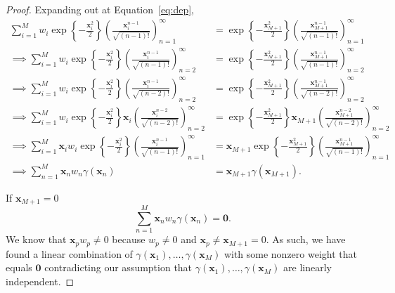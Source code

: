 \begin{proof}
    Expanding out at Equation~\ref{eq:dep},
    \begin{align*}
        \sum_{i = 1}^{M}w_i \exp\left\{-\frac{\mathbf{x}_{i}^2}2 \right\} \left(\frac{ \mathbf{x}_i^{n - 1} }{ \sqrt{(n - 1)!} }\right)_{n=1}^{\infty}
        & =
        \exp\left\{-\frac{\mathbf{x}_{M + 1}^2}2 \right\} \left(\frac{ \mathbf{x}_{M + 1}^{n - 1} }{ \sqrt{(n - 1)!} }\right)_{n=1}^{\infty} \\
        \implies
        \sum_{i = 1}^{M}w_i \exp\left\{-\frac{\mathbf{x}_{i}^2}2 \right\} \left(\frac{ \mathbf{x}_i^{n - 1} }{ \sqrt{(n - 1)!} }\right)_{n=2}^{\infty}
        & =
        \exp\left\{-\frac{\mathbf{x}_{M + 1}^2}2 \right\} \left(\frac{ \mathbf{x}_{M + 1}^{n - 1} }{ \sqrt{(n - 1)!} }\right)_{n=2}^{\infty} \\
        \implies
        \sum_{i = 1}^{M}w_i \exp\left\{-\frac{\mathbf{x}_{i}^2}2 \right\} \left( \frac{ \mathbf{x}_i^{n - 1} }{ \sqrt{(n - 2)!} }\right)_{n=2}^{\infty}
        & =
        \exp\left\{-\frac{\mathbf{x}_{M + 1}^2}2 \right\} \left(\frac{ \mathbf{x}_{M + 1}^{n - 1} }{ \sqrt{(n - 2)!} }\right)_{n=2}^{\infty} \\
        \implies
        \sum_{i = 1}^{M}w_i \exp\left\{-\frac{\mathbf{x}_{i}^2}2 \right\} \mathbf{x}_i \left( \frac{ \mathbf{x}_i^{n - 2} }{ \sqrt{(n - 2)!} }\right)_{n=2}^{\infty}
        & =
        \exp\left\{-\frac{\mathbf{x}_{M + 1}^2}2 \right\} \mathbf{x}_{M + 1}\left(\frac{ \mathbf{x}_{M + 1}^{n - 2} }{ \sqrt{(n - 2)!} }\right)_{n=2}^{\infty} \\
        \implies
        \sum_{i = 1}^{M}\mathbf{x}_i w_i \exp\left\{-\frac{\mathbf{x}_{i}^2}2 \right\} \left( \frac{ \mathbf{x}_i^{n - 1} }{ \sqrt{(n - 1)!} }\right)_{n=1}^{\infty}
        & =
        \mathbf{x}_{M + 1}\exp\left\{-\frac{\mathbf{x}_{M + 1}^2}2 \right\}  \left(\frac{ \mathbf{x}_{M + 1}^{n - 1} }{ \sqrt{(n - 1)!} }\right)_{n=1}^{\infty} \\
        \implies
        \sum\limits_{n=1}^{M} \mathbf{x}_n w_n \gamma(\mathbf{x}_n) & = \mathbf{x}_{M + 1} \gamma(\mathbf{x}_{M + 1}).
    \end{align*}

    If $\mathbf{x}_{M + 1} = 0$
    \begin{equation*}
        \sum\limits_{n=1}^{M} \mathbf{x}_n w_n \gamma(\mathbf{x}_n) = \mathbf{0}.
    \end{equation*}
    We know that $\mathbf{x}_p w_p \neq 0$ because $w_p \neq 0$ and $\mathbf{x}_p \neq \mathbf{x}_{M + 1} = 0$.
    As such, we have found a linear combination of $\gamma(\mathbf{x}_1), \dots, \gamma(\mathbf{x}_M)$ with some nonzero weight that equals $\mathbf{0}$ contradicting our assumption that $\gamma(\mathbf{x}_1), \dots, \gamma(\mathbf{x}_M)$ are linearly independent.


\end{proof}
